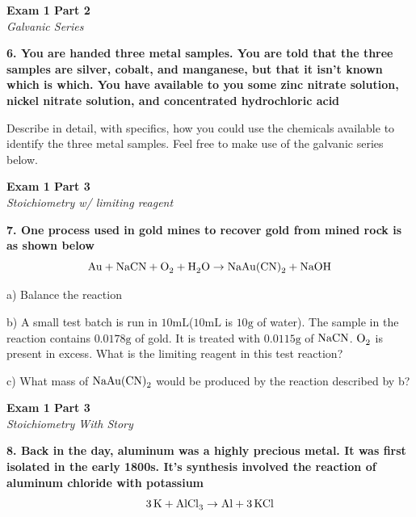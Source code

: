 \documentclass{article}
\begin{document}
    \begin{center}
        \textbf{Exam 1 Part 2}\\
        \textit{Galvanic Series}
    \end{center}
    \textbf{6. You are handed three metal samples. You are told that the three samples are silver, cobalt, and manganese, but that it isn't known which is which. You have available to you some zinc nitrate solution, nickel nitrate solution, and concentrated hydrochloric acid}

    Describe in detail, with specifics, how you could use the chemicals available to identify the three metal samples. Feel free to make use of the galvanic series below.

    \pagebreak

    \begin{center}
        \textbf{Exam 1 Part 3}\\
        \textit{Stoichiometry w/ limiting reagent}
    \end{center}
    \textbf{7. One process used in gold mines to recover gold from mined rock is as shown below}
    $$  \ce{Au} +  \ce{NaCN} +   \ce{O_{2}} +  \ce{H_{2}O} \rightarrow  \ce{NaAu(CN)_{2}} +  \ce{NaOH}$$

    a) Balance the reaction

    b) A small test batch is run in $10 \si{\milli\liter}$($10 \si{\milli\liter}$ is $10 \si{\gram}$ of water). The sample in the reaction contains $0.0178 \si{\gram}$ of gold. It is treated with $0.0115 \si{\gram}$ of $\ce{NaCN}$. $\ce{O_{2}}$ is present in excess. What is the limiting reagent in this test reaction?

    c) What mass of $\ce{NaAu(CN)_{2}}$ would be produced by the reaction described by b?

    \pagebreak

    \begin{center}
        \textbf{Exam 1 Part 3}\\
        \textit{Stoichiometry With Story}
    \end{center}
    \textbf{8. Back in the day, aluminum was a highly precious metal. It was first isolated in the early 1800s. It's synthesis involved the reaction of aluminum chloride with potassium}
    $$ \ce{3K} + \ce{AlCl_{3}} \rightarrow \ce{Al} + \ce{3KCl}$$
\end{document}
